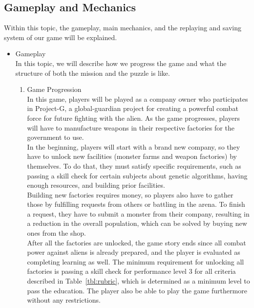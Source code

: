 \documentclass[12pt,oneside,openright,a4paper]{cpe-english-project}
\begin{document}
\subsection{Gameplay and Mechanics}
Within this topic, the gameplay, main mechanics, and the replaying and saving system of our game will be explained.

\begin{itemize}
\item Gameplay \\
In this topic, we will describe how we progress the game and what the structure of both the mission and the puzzle is like.
	\begin{enumerate}
	\item Game Progression \\
	In this game, players will be played as a company owner who participates in Project-G, a global-guardian project for creating a powerful combat force for future fighting with the alien. As the game progresses, players will have to manufacture weapons in their respective factories for the government to use. \\
	In the beginning, players will start with a brand new company, so they have to unlock new facilities (monster farms and weapon factories) by themselves. To do that, they must satisfy specific requirements, such as passing a skill check for certain subjects about genetic algorithms, having enough resources, and building prior facilities. \\
	Building new factories requires money, so players also have to gather those by fulfilling requests from others or battling in the arena. To finish a request, they have to submit a monster from their company, resulting in a reduction in the overall population, which can be solved by buying new ones from the shop. \\
	After all the factories are unlocked, the game story ends since all combat power against aliens is already prepared, and the player is evaluated as completing learning as well. The minimum requirement for unlocking all factories is passing a skill check for performance level 3 for all criteria described in Table~\ref{tbl:rubric}, which is determined as a minimum level to pass the education. The player also be able to play the game furthermore without any restrictions.


\end{enumerate}
\end{itemize}
\end{document}

